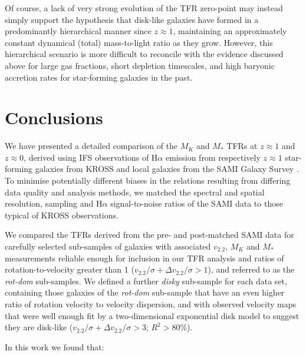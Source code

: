 \documentclass[a4paper,fleqn,usenatbib]{mnras}
\begin{document}
{Of course, a lack of very strong evolution of the TFR zero-point may instead simply support the hypothesis that disk-like galaxies have formed in a predominantly hierarchical manner since $z\approx1$, maintaining an approximately constant dynamical (total) mass-to-light ratio as they grow. However, this hierarchical scenario is more difficult to reconcile with the evidence discussed above for large gas fractions, short depletion timescales, and high baryonic accretion rates for star-forming galaxies in the past.

\section{Conclusions}
\label{sec:SAMIvsKROSSconclusions}

We have presented a detailed comparison of the $M_{K}$ and $M_{*}$ TFRs at $z\approx1$ and $z\approx0$, derived using IFS observations of H$\alpha$ emission from respectively $z\approx1$ star-forming galaxies from KROSS \citep{Stott:2016,Harrison:2017} and local galaxies from the SAMI Galaxy Survey \citep{Croom:2012,Bryant:2015}. To minimise potentially different biases in the relations resulting from differing data quality and analysis methods, we matched the spectral and spatial resolution, sampling and H$\alpha$ signal-to-noise ratios of the SAMI data to those typical of KROSS observations.

We compared the TFRs derived from the pre- and post-matched SAMI data for carefully selected sub-samples of galaxies with associated $v_{2.2}$, $M_{K}$ and $M_{*}$ measurements reliable enough for inclusion in our TFR analysis and ratios of rotation-to-velocity greater than 1 ($v_{2.2}/\sigma + \Delta v_{2.2}/\sigma > 1$), and referred to as the \textit{rot-dom} sub-samples. We defined a further \textit{disky} sub-sample for each data set, containing those galaxies of the \textit{rot-dom} sub-sample that have an even higher ratio of rotation velocity to velocity dispersion, and with observed velocity maps that were well enough fit by a two-dimensional exponential disk model to suggest they are disk-like ($v_{2.2}/\sigma + \Delta v_{2.2}/\sigma > 3$; $R^{2} > 80$\%). \\

\smallskip

\noindent In this work we found that:

\smallskip 

}
\end{document}
